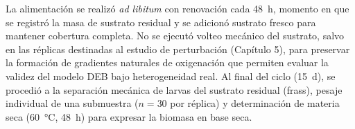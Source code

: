 La alimentación se realizó \textit{ad libitum} con renovación cada \SI{48}{\hour}, momento en que se registró la masa de sustrato residual y se adicionó sustrato fresco para mantener cobertura completa. No se ejecutó volteo mecánico del sustrato, salvo en las réplicas destinadas al estudio de perturbación (Capítulo 5), para preservar la formación de gradientes naturales de oxigenación que permiten evaluar la validez del modelo DEB bajo heterogeneidad real. Al final del ciclo (\SI{15}{\day}), se procedió a la separación mecánica de larvas del sustrato residual (frass), pesaje individual de una submuestra ($n = 30$ por réplica) y determinación de materia seca (\SI{60}{\celsius}, \SI{48}{\hour}) para expresar la biomasa en base seca.
